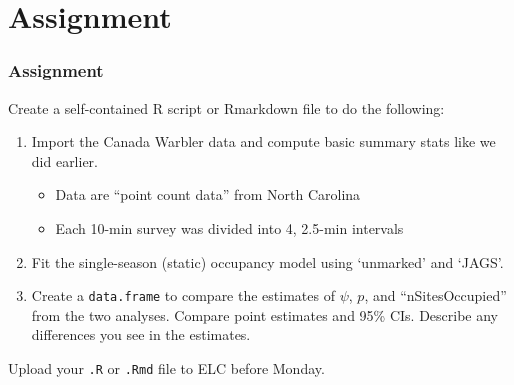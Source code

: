 \documentclass[color=usenames,dvipsnames]{beamer}\usepackage[]{graphicx}\usepackage[]{color}
\newcommand{\inr}[1]{\colorbox{inlinecolor}{\texttt{#1}}}
\begin{document}






\section{Assignment}











\begin{frame}
  \frametitle{Assignment}
  \small
  Create a self-contained R script or Rmarkdown file
  to do the following:
  \begin{enumerate}
    \small
    \item Import the Canada Warbler data and compute basic summary
      stats like we did earlier.
    \begin{itemize}
      \item Data are ``point count data'' from North Carolina
      \item Each 10-min survey was divided into 4, 2.5-min intervals 
    \end{itemize}
    \item Fit the single-season (static) occupancy model using
      `unmarked' and `JAGS'. 
    \item Create a \inr{data.frame} to compare the estimates of
      $\psi$, $p$, and ``nSitesOccupied'' from the two
      analyses. Compare point estimates and 95\% CIs. Describe any
      differences you see in the estimates.
  \end{enumerate}
  Upload your {\tt .R} or {\tt .Rmd} file to ELC before Monday. 
\end{frame}
\end{document}
